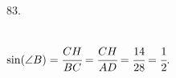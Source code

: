 83. \begin{figure}[ht!]
\end{figure}\\
$\sin(\angle B)=\cfrac{CH}{BC}=\cfrac{CH}{AD}=\cfrac{14}{28}=\cfrac{1}{2}.$\\
